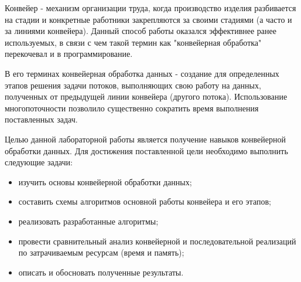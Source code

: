 \setcounter{page}{4}

Конвейер - механизм организации труда, когда производство изделия разбивается на стадии и конкретные работники закрепляются за своими стадиями (а часто и за линиями конвейера). Данный способ работы оказался эффективнее ранее используемых, в связи с чем такой термин как "конвейерная обработка" перекочевал и в программирование.

В его терминах конвейерная обработка данных - создание для определенных этапов решения задачи потоков, выполняющих свою работу на данных, полученных от предыдущей линии конвейера (другого потока). Использование многопоточности позволило существенно сократить время выполнения поставленных задач. 

Целью данной лабораторной работы является получение навыков конвейерной обработки данных. Для достижения поставленной цели необходимо выполнить следующие задачи:
\begin{itemize}
	\item изучить основы конвейерной обработки данных;
	\item составить схемы алгоритмов основной работы конвейера и его этапов;
	\item реализовать разработанные алгоритмы;
	\item провести сравнительный анализ конвейерной и последовательной реализаций по затрачиваемым ресурсам (время и память);
	\item описать и обосновать полученные результаты.
\end{itemize}